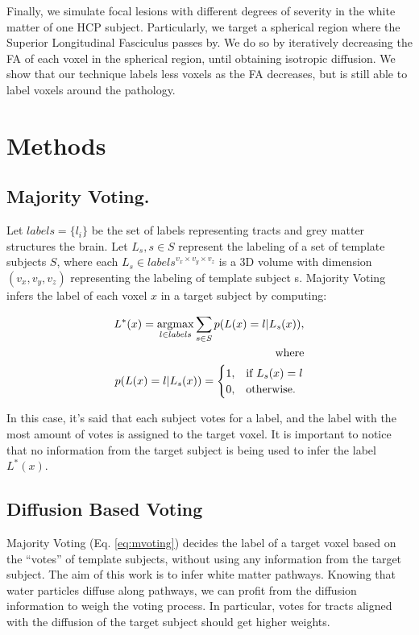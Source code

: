 Finally, we simulate focal lesions with different degrees of severity in the white
matter of one HCP subject. Particularly, we target a spherical region where
the Superior Longitudinal Fasciculus passes by. We do so by iteratively decreasing
the FA of each voxel in the spherical region, until obtaining isotropic diffusion.
We show that our technique labels less voxels as the FA decreases, but is still
able to label voxels around the pathology. 

\section{Methods}
\label{sec:methods}

\subsection{Majority Voting.}
Let $labels = \{l_i\}$ be the set of labels representing tracts and grey matter
structures the brain. Let ${L_s}, s\in S$ represent the labeling of a set of
template subjects $S$, where each $L_s \in labels^{v_x\times v_y \times v_z}$ is
a 3D volume with dimension $(v_x,v_y,v_z)$ representing the labeling of template
subject s. Majority Voting~\cite{Rohlfing2004} infers the label of
each voxel $x$ in a target subject by computing:

\begin{equation}
\label{eq:mvoting}
\begin{aligned}
    L^*(x) = \operatorname*{argmax}_{l \in labels} \sum_{s\in S} p(L(x) = l | L_s(x)),\\
    \text{where} \\
    p(L(x) = l | L_s(x)) =
    \begin{cases}
        1,& \text{if } L_s(x) = l \\
        0,& \text{otherwise.}
    \end{cases}
\end{aligned}
\end{equation}

In this case, it's said that each subject votes for a label, and the label with
the most amount of votes is assigned to the target voxel. It is important to
notice that no information from the target subject is being used to infer the
label $L^*(x)$.

\subsection{Diffusion Based Voting}
Majority Voting (Eq. \ref{eq:mvoting}) decides the label of a target voxel based
on the ``votes'' of template subjects, without using any information from the
target subject. The aim of this work is to infer white matter pathways. Knowing
that water particles diffuse along pathways, we can profit from the diffusion information
to weigh the voting process. In particular, votes for tracts aligned with the
diffusion of the target subject should get higher weights.

